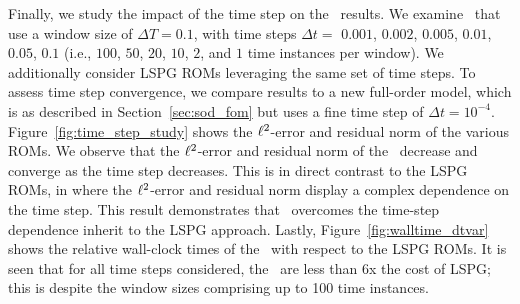 Finally, we study the impact of the time step on the \methodAcronymROM\ results. We examine \methodAcronymROMs\ that use a
window size of $\Delta T = 0.1$, with time steps $\Delta t =$  $0.001$, $0.002$, $0.005$, $0.01$, $0.05$, $0.1$ (i.e.,  
$100$, $50$, $20$, $10$, $2$, and $1$ time instances per window). We additionally 
consider LSPG ROMs leveraging the same set of time steps. To assess time step convergence, we compare results to a new full-order model, which is as described in Section~\ref{sec:sod_fom} but uses a fine time step of $\Delta t = 10^{-4}$. Figure~\ref{fig:time_step_study} shows the $\ell^2$-error and residual norm  
of the various ROMs. We observe that the $\ell^2$-error and residual norm 
of the \methodAcronymROMs\ decrease and converge as the time step decreases. This is in direct contrast to the LSPG ROMs, in where the $\ell^2$-error and residual norm display a complex dependence on the time step. This result 
demonstrates that \methodAcronym\ overcomes the time-step dependence inherit to the LSPG approach. Lastly, Figure~\ref{fig:walltime_dtvar}
shows the relative wall-clock times of the \methodAcronymROMs\ with respect to the LSPG ROMs. It is seen that for all time steps considered, the \methodAcronymROMs\ 
are less than 6x the cost of LSPG; this is despite the window sizes comprising up to 100 time instances. 
